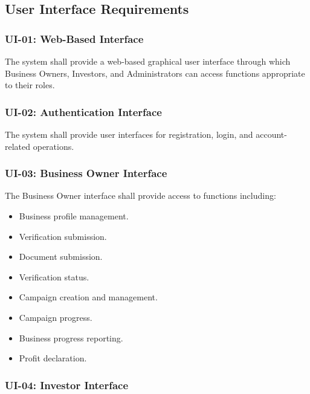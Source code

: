 
\subsection{User Interface Requirements}

\subsubsection{UI-01: Web-Based Interface}

The system shall provide a web-based graphical user interface through which
Business Owners, Investors, and Administrators can access functions
appropriate to their roles.

\subsubsection{UI-02: Authentication Interface}

The system shall provide user interfaces for registration, login, and
account-related operations.

\subsubsection{UI-03: Business Owner Interface}

The Business Owner interface shall provide access to functions including:

\begin{itemize}
    \item Business profile management.
    \item Verification submission.
    \item Document submission.
    \item Verification status.
    \item Campaign creation and management.
    \item Campaign progress.
    \item Business progress reporting.
    \item Profit declaration.
\end{itemize}

\subsubsection{UI-04: Investor Interface}

